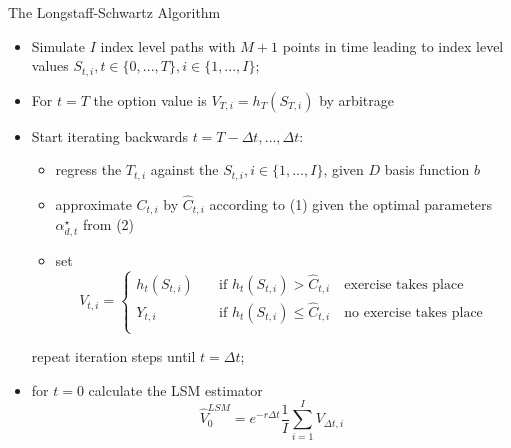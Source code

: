 \documentclass[11pt]{beamer}
\begin{document}
\begin{frame}{The Longstaff-Schwartz Algorithm}
\begin{itemize}
\item Simulate $I$ index level paths with $M + 1$ points in time leading to index level values 
$S_{t,i} , t\in \{0, ..., T \}, i \in \{1, ..., I \}$;
\item  For $t=T$ the option value is $V_{T,i} = h_T(S_{T,i})$ by arbitrage
\item  Start iterating backwards $t = T - \Delta t , \dots, \Delta t$:
\begin{itemize}
    \item regress the $T_{t,i}$ against the $S_{t,i}, i \in \{1, \dots, I\}$, given $D$ basis function $b$
    \item approximate $C_{t,i}$ by $\hat C_{t,i}$ according to (1) given the optimal parameters $\alpha^\star_{d,t}$ from       (2)
    \item set 
    $$V_{t,i}= 
    \begin{cases}
      h_t(S_{t,i})       & \quad \text{if } h_t(S_{t,i}) >   \hat C_{t,i} \quad \text{exercise takes place}\\
      Y_{t,i}            & \quad \text{if } h_t(S_{t,i}) \le \hat C_{t,i} \quad \text{no exercise takes place}\\
    \end{cases}
    $$
\end{itemize}    
  repeat iteration steps until $t=\Delta t$;
\item for $t=0$ calculate the LSM estimator
$$
\hat V_0^{LSM} = e^{-r \Delta t} \frac{1}{I}  \sum\limits_{i=1}^I V_{\Delta t,i} 
$$
\end{itemize}
\end{frame}
\end{document}
